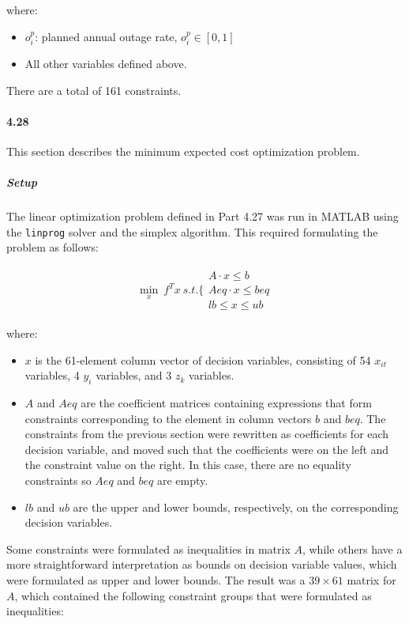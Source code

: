 \documentclass{article}
\begin{document}
	where:
	\begin{itemize}
		\item $o_i^p$: planned annual outage rate, $o_i^p \in [0, 1]$
		\item All other variables defined above.
	\end{itemize}
	
	There are a total of 161 constraints.
	
	
\paragraph{4.28}
	This section describes the minimum expected cost optimization problem.
	
	\subparagraph{Setup}
		The linear optimization problem defined in Part 4.27 was run in MATLAB using the \texttt{linprog} solver and the simplex algorithm. This required formulating the problem as follows:
		
	\begin{align*}
		\underset{x}{\min} \ f^T x \ 
		s.t. \Bigg\{ \substack{
		A \cdot x  \leq b \\
		Aeq \cdot x \leq beq \\
		lb \leq x \leq ub}
	\end{align*}
	
	where:
	\begin{itemize}
		\item $x$ is the 61-element column vector of decision variables, consisting of 54 $x_{it}$ variables, 4 $y_i$ variables, and 3 $z_k$ variables.
		\item $A$ and $Aeq$ are the coefficient matrices containing expressions that form constraints corresponding to the element in column vectors $b$ and $beq$. The constraints from the previous section were rewritten as coefficients for each decision variable, and moved such that the coefficients were on the left and the constraint value on the right. In this case, there are no equality constraints so $Aeq$ and $beq$ are empty.
		\item $lb$ and $ub$ are the upper and lower bounds, respectively, on the corresponding decision variables.
	\end{itemize}
	
	Some constraints were formulated as inequalities in matrix $A$, while others have a more straightforward interpretation as bounds on decision variable values, which were formulated as upper and lower bounds. The result was a $39 \times 61$ matrix for $A$, which contained the following constraint groups that were formulated as inequalities:
	
\end{document}
